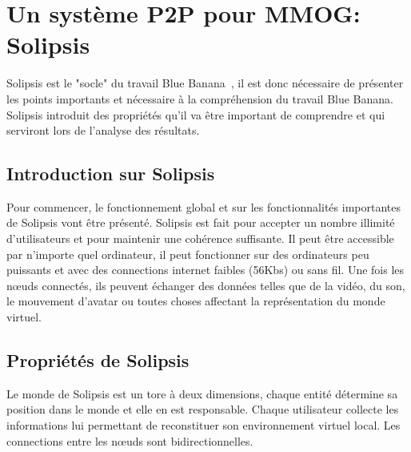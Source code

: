 \section{Un système P2P pour MMOG: Solipsis}
	\label{solipsis}
	Solipsis est le "socle" du travail Blue Banana~\cite{keller-solipsis}, il est donc nécessaire de présenter les points importants et nécessaire à la compréhension du travail Blue Banana. Solipsis introduit des propriétés qu'il va être important de comprendre et qui serviront lors de l'analyse des résultats.
	\subsection{Introduction sur Solipsis} 
	\par Pour commencer, le fonctionnement global et sur les fonctionnalités importantes de Solipsis vont être présenté. Solipsis est fait pour accepter un nombre illimité d'utilisateurs et pour maintenir une cohérence suffisante. Il peut être accessible par n'importe quel ordinateur, il peut fonctionner sur des ordinateurs peu puissants et avec des connections internet faibles (56Kbs) ou sans fil. Une fois les nœuds connectés, ils peuvent échanger des données telles que de la vidéo, du son, le mouvement d'avatar ou toutes choses affectant la représentation du monde virtuel. \\
	\subsection{Propriétés de Solipsis}
	Le monde de Solipsis est un tore à deux dimensions, chaque entité détermine sa position dans le monde et elle en est responsable. Chaque utilisateur collecte les informations lui permettant de reconstituer son environnement virtuel local. Les connections entre les nœuds sont bidirectionnelles. 
